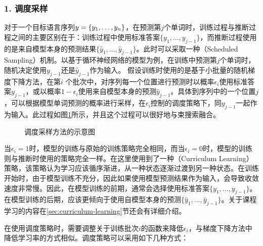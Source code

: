 
\subsubsection{1. 调度采样}

\parinterval 对于一个目标语言序列${y}=\{{y}_1,\ldots,{y}_n\}$，在预测第$j$个单词时，训练过程与推断过程之间的主要区别在于：训练过程中使用标准答案$\{{y}_{1},...,{y}_{j-1}\}$，而推断过程使用的是来自模型本身的预测结果$\{\hat{{y}}_{1},...,\hat{{y}}_{j-1}\}$。此时可以采取一种{\small{}}（Scheduled Sampling）机制。以基于循环神经网络的模型为例，在训练中预测第$j$个单词时，随机决定使用${y}_{j-1}$还是$\hat{{y}}_{j-1}$作为输入。 假设训练时使用的是基于小批量的随机梯度下降方法，在第$i$ 个批次中，对序列每一个位置进行预测时以概率$\epsilon_i$使用标准答案${y}_{j-1}$，或以概率${1-\epsilon_i}$使用来自模型本身的预测$\hat{{y}}_{j-1}$。具体到序列中的一个位置$j$，可以根据模型单词预测的概率进行采样，在$\epsilon_i$控制的调度策略下，同${y}_{j-1}$一起作为输入。此过程如图\ref{fig:13-9}所示，并且这个过程可以很好地与束搜索融合。

\begin{figure}[htp]
\centering

\caption{调度采样方法的示意图}
\label{fig:13-9}
\end{figure}

\parinterval 当$\epsilon_i=1$时，模型的训练与原始的训练策略完全相同，而当$\epsilon_i=0$时，模型的训练则与推断时使用的策略完全一样。在这里使用到了一种{\small{}}（Curriculum Learning）策略，该策略认为学习应该循序渐进，从一种状态逐渐过渡到另一种状态。在训练开始时，由于模型训练不充分，因此如果使用模型预测结果作为输入，会导致收敛速度非常慢。因此，在模型训练的前期，通常会选择使用标准答案$\{{y}_{1},...,{y}_{j-1}\}$。在模型训练的后期，应该更倾向于使用自模型本身的预测$\{\hat{{y}}_{1},...,\hat{{y}}_{j-1}\}$。关于课程学习的内容在\ref{sec:curriculum-learning}节还会有详细介绍。

\parinterval 在使用调度策略时，需要调整关于训练批次$i$的函数来降低$\epsilon_i$，与梯度下降方法中降低学习率的方式相似。调度策略可以采用如下几种方式：

